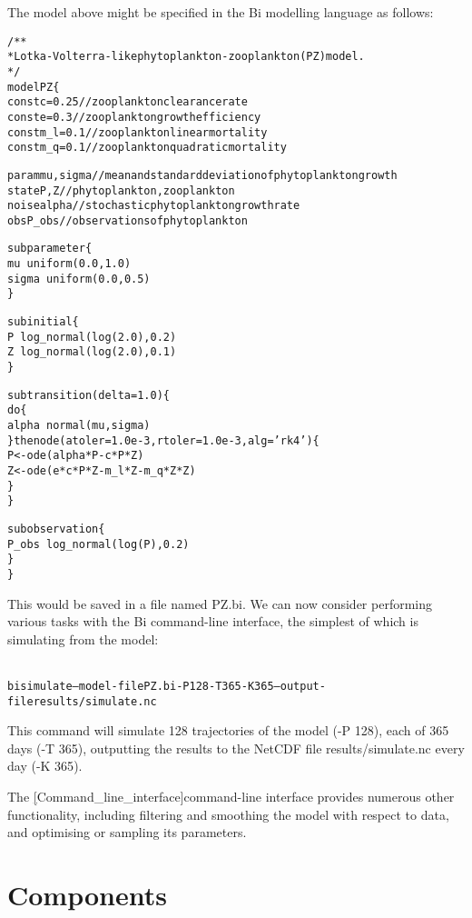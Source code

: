 The model above might be specified in the Bi modelling language as follows:
\begin{alltt}{\sf
    /**
     * Lotka-Volterra-like phytoplankton-zooplankton (PZ) model.
     */
    model PZ \{
      const c = 0.25     // zooplankton clearance rate
      const e = 0.3      // zooplankton growth efficiency
      const m_l = 0.1    // zooplankton linear mortality
      const m_q = 0.1    // zooplankton quadratic mortality

      param mu, sigma     // mean and standard deviation of phytoplankton growth
      state P, Z         // phytoplankton, zooplankton
      noise alpha        // stochastic phytoplankton growth rate
      obs P_obs          // observations of phytoplankton
  
      sub parameter \{
        mu ~ uniform(0.0, 1.0)
        sigma ~ uniform(0.0, 0.5)
      \}
  
      sub initial \{
        P ~ log_normal(log(2.0), 0.2)
        Z ~ log_normal(log(2.0), 0.1)
      \}

      sub transition(delta = 1.0) \{
        do \{
          alpha ~ normal(mu, sigma)
        \} then ode(atoler = 1.0e-3, rtoler = 1.0e-3, alg = 'rk4') \{
          P <- ode(alpha*P - c*P*Z)
          Z <- ode(e*c*P*Z - m_l*Z - m_q*Z*Z)
        \}
      \}

      sub observation \{
        P_obs ~ log_normal(log(P), 0.2)
      \}
    \}
}\end{alltt}

This would be saved in a file named {\sf PZ.bi}. We can now consider
performing various tasks with the Bi command-line interface, the simplest of
which is simulating from the model:
\begin{alltt}{\sf
bi simulate --model-file PZ.bi -P 128 -T 365 -K 365 --output-file results/simulate.nc
}\end{alltt}
This command will simulate 128 trajectories of the model ({\sf -P 128}), each
of 365 days ({\sf -T 365}), outputting the results to the NetCDF
file {\sf results/simulate.nc} every day ({\sf -K 365}).

The \hyperref[hyper][Command_line_interface]{command-line interface} provides
numerous other functionality, including filtering and smoothing the model with
respect to data, and optimising or sampling its parameters.

\section{Components\label{Components}}

